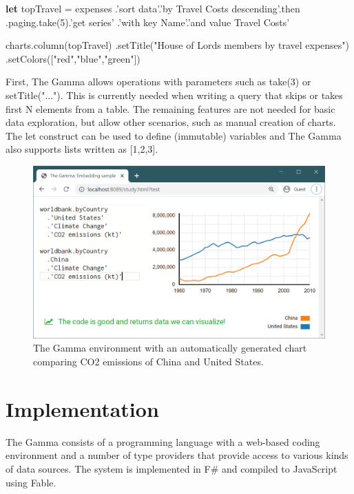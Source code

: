 \documentclass{sigchi}
\newcommand{\kvd}[1]{\textbf{#1}}
\newcommand{\ikvd}[1]{{\fontfamily{zi4}\selectfont\small #1}}
\begin{document}
\begin{thegamma}
\kvd{let} topTravel =
  expenses
    .'sort data'.'by Travel Costs descending'.then
    .paging.take(5).'get series'
    .'with key Name'.'and value Travel Costs'

charts.column(topTravel)
  .setTitle("House of Lords members by travel expenses")
  .setColors(["red","blue","green"])
\end{thegamma}

First, The Gamma allows operations with parameters such as \ikvd{take(3)} or \ikvd{setTitle("...")}.
This is currently needed when writing a query that skips or takes first N elements from a table.
The remaining features are not needed for basic data exploration, but allow other scenarios, such
as manual creation of charts. The \ikvd{let} construct can be used to define (immutable) variables
and The Gamma also supports lists written as \ikvd{[1,2,3]}.


\begin{figure}
\includegraphics[width=1\columnwidth]{figures/sidebyside}
\caption{The Gamma environment with an automatically generated chart comparing CO2 emissions
of China and United States.}
\label{fig:sidebyside}
\end{figure}


\section{Implementation}
\label{sec:implementation}
The Gamma consists of a programming language with a web-based coding environment and a number
of type providers that provide access to various kinds of data sources. The system is implemented
in F\# and compiled to JavaScript using Fable.
\end{document}
